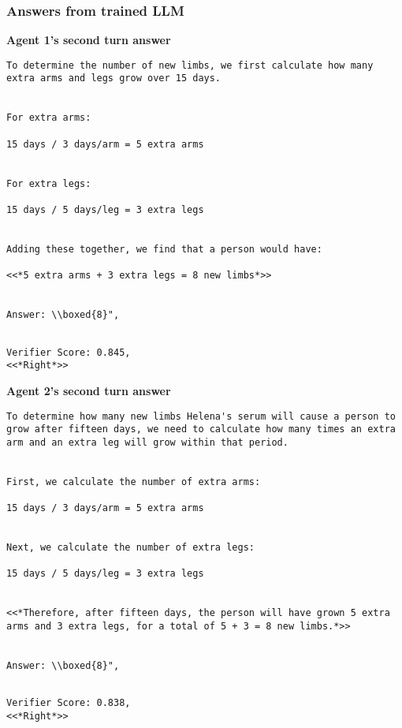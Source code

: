 \subsubsection{Answers from \oursspace trained LLM}
\textbf{Agent 1's second turn answer }
\begin{lstlisting}
To determine the number of new limbs, we first calculate how many extra arms and legs grow over 15 days.


For extra arms:

15 days / 3 days/arm = 5 extra arms


For extra legs:

15 days / 5 days/leg = 3 extra legs


Adding these together, we find that a person would have:

<<*5 extra arms + 3 extra legs = 8 new limbs*>>


Answer: \\boxed{8}",


\end{lstlisting}
\begin{lstlisting}
Verifier Score: 0.845,
<<*Right*>> 
\end{lstlisting}



\textbf{Agent 2's second turn answer }
\begin{lstlisting}
To determine how many new limbs Helena's serum will cause a person to grow after fifteen days, we need to calculate how many times an extra arm and an extra leg will grow within that period.


First, we calculate the number of extra arms:

15 days / 3 days/arm = 5 extra arms


Next, we calculate the number of extra legs:

15 days / 5 days/leg = 3 extra legs


<<*Therefore, after fifteen days, the person will have grown 5 extra arms and 3 extra legs, for a total of 5 + 3 = 8 new limbs.*>>


Answer: \\boxed{8}",


\end{lstlisting}
\begin{lstlisting}
Verifier Score: 0.838,
<<*Right*>> 
\end{lstlisting}


